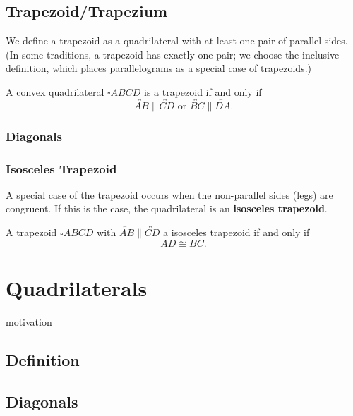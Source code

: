 \documentclass[../../../main/main.tex]{subfiles}
\begin{document}
\section{Trapezoid/Trapezium}

We define a trapezoid as a quadrilateral with at least one pair of parallel sides. (In some traditions, a trapezoid has exactly one pair; we choose the inclusive definition, which places parallelograms as a special case of trapezoids.)

\begin{definition}
    A convex quadrilateral $\square ABCD$ is a trapezoid if and only if
    \[
    \overleftrightarrow{AB} \parallel \overleftrightarrow{CD} \text{ or } \overleftrightarrow{BC} \parallel \overleftrightarrow{DA}.
    \]
\end{definition}

\subsection{Diagonals}

\subsection{Isosceles Trapezoid}

A special case of the trapezoid occurs when the non-parallel sides (legs) are congruent. If this is the case, the quadrilateral is an \textbf{isosceles trapezoid}.

\begin{definition}
    A trapezoid $\square ABCD$ with $\overleftrightarrow{AB} \parallel \overleftrightarrow{CD}$ a isosceles trapezoid if and only if
    \[
    AD \cong BC.
    \]
\end{definition}

\chapter{Quadrilaterals}

motivation

\section{Definition}

\section{Diagonals}
\end{document}
